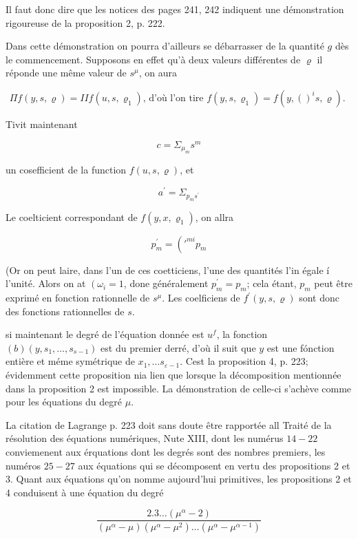 \documentclass{article}
\begin{document}
Il faut donc dire que les notices des pages 241, 242 indiquent une démonstration rigoureuse de la proposition 2, p. 222.

Dans cette démonstration on pourra d'ailleurs se débarrasser de la quantité \(g\) dès le commencement. Supposons en effet qu'à deux valeurs différentes de \(\varrho\) il réponde une même valeur de \(s^{\mu}\), on aura

\[
\Pi f(y, s, \varrho)=I I f\left(u, s, \varrho_{1}\right) \text {, d'où l'on tire } f\left(y, s, \varrho_{1}\right)=f\left(y,()^{i} s, \varrho\right) \text {. }
\]

Tivit maintenant

\[
c=\Sigma_{\mu_{m}} s^{m}
\]

un cosefficient de la function \(f(u, s, \varrho)\), et

\[
a^{\prime}=\Sigma_{p_{m} s^{\prime}}
\]

Le coelticient correspondant de \(f\left(y, x, \varrho_{1}\right)\), on allra

\[
p_{m}^{\prime}=\left(\prime^{m i} p_{m}\right.
\]

(Or on peut laire, dans l'un de ces coetticiens, l'une des quantités l'in égale í l'unité. Alors on at \(\left(\omega_{i}=1\right.\), done généralement \(p_{m}^{\prime}=p_{m}\); cela étant, \(p_{m}\) peut être exprimé en fonction rationnelle de \(s^{\mu}\). Les coelficiens de \(f^{\prime}(y, s, \varrho)\) sont donc des fonctions rationnelles de \(s\).

si maintenant le degré de l'équation donnée est \(u^{f}\), la fonction \((b)\left(y, s_{1}, \ldots, s_{s-1}\right)\) est du premier derré, d'où il suit que \(y\) est une fónction entière et méme symétrique de \(x_{1}, \ldots s_{\varepsilon-1}\). Cest la proposition 4, p. 223; évidemment cette proposition nia lien que lorsque la décomposition mentionnée dans la proposition 2 est impossible. La démonstration de celle-ci s'achève comme pour les équations du degré \(\mu\).

La citation de Lagrange p. 223 doit sans doute être rapportée all Traité de la résolution des équations numériques, Nute XIII, dont les numérus \(14-22\) conviemenent aux érquations dont les degrés sont des nombres premiers, les numéros \(25-27\) aux
équations qui se décomposent en vertu des propositions 2 et 3. Quant aux équations qu'on nomme aujourd'hui primitives, les propositions 2 et 4 conduisent à une équation du degré

\[
\frac{2.3 \ldots\left(\mu^{\alpha}-2\right)}{\left(\mu^{\alpha}-\mu\right)\left(\mu^{\alpha}-\mu^{2}\right) \ldots\left(\mu^{\alpha}-\mu^{\alpha-1}\right)}
\]
\end{document}
